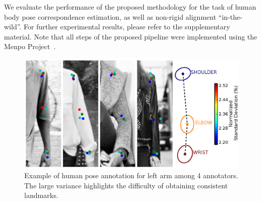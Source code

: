 We evaluate the performance of the proposed methodology for the task of human body pose correspondence estimation, as well as non-rigid alignment ``in-the-wild''. For further experimental results, please refer to the supplementary material. Note that all steps of the proposed pipeline were implemented using the Menpo Project~\cite{menpo14}.


\begin{figure}[t!]
    \centering
    \includegraphics[width=\columnwidth]{resources/Fig_Variance/final}
    \caption{Example of human pose annotation for left arm among 4 annotators. The large variance highlights the difficulty of obtaining consistent landmarks.}
    \label{fig:variance}
\end{figure}

